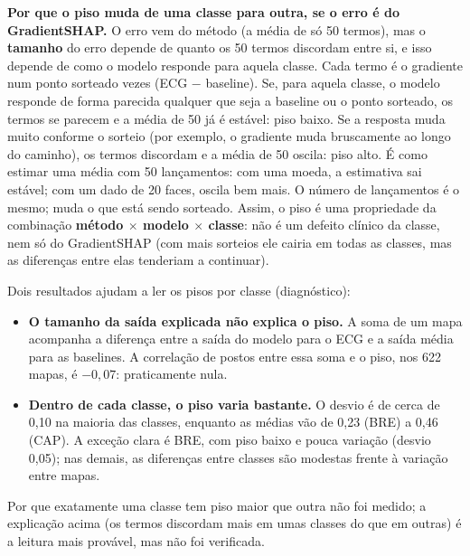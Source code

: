 \documentclass[11pt,a4paper]{article}
\begin{document}
\textbf{Por que o piso muda de uma classe para outra, se o erro é do GradientSHAP.} O erro vem do método (a média de só 50 termos), mas o \textbf{tamanho} do erro depende de quanto os 50 termos discordam entre si, e isso depende de como o modelo responde para aquela classe. Cada termo é o gradiente num ponto sorteado vezes (ECG $-$ baseline). Se, para aquela classe, o modelo responde de forma parecida qualquer que seja a baseline ou o ponto sorteado, os termos se parecem e a média de 50 já é estável: piso baixo. Se a resposta muda muito conforme o sorteio (por exemplo, o gradiente muda bruscamente ao longo do caminho), os termos discordam e a média de 50 oscila: piso alto. É como estimar uma média com 50 lançamentos: com uma moeda, a estimativa sai estável; com um dado de 20 faces, oscila bem mais. O número de lançamentos é o mesmo; muda o que está sendo sorteado. Assim, o piso é uma propriedade da combinação \textbf{método $\times$ modelo $\times$ classe}: não é um defeito clínico da classe, nem só do GradientSHAP (com mais sorteios ele cairia em todas as classes, mas as diferenças entre elas tenderiam a continuar).

Dois resultados ajudam a ler os pisos por classe (diagnóstico):
\begin{itemize}
\item \textbf{O tamanho da saída explicada não explica o piso.} A soma de um mapa acompanha a diferença entre a saída do modelo para o ECG e a saída média para as baselines. A correlação de postos entre essa soma e o piso, nos 622 mapas, é $-0{,}07$: praticamente nula.
\item \textbf{Dentro de cada classe, o piso varia bastante.} O desvio é de cerca de 0,10 na maioria das classes, enquanto as médias vão de 0,23 (BRE) a 0,46 (CAP). A exceção clara é BRE, com piso baixo e pouca variação (desvio 0,05); nas demais, as diferenças entre classes são modestas frente à variação entre mapas.
\end{itemize}
Por que exatamente uma classe tem piso maior que outra não foi medido; a explicação acima (os termos discordam mais em umas classes do que em outras) é a leitura mais provável, mas não foi verificada.
\end{document}
